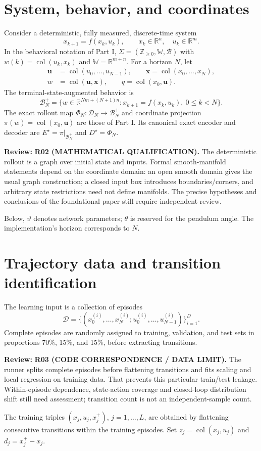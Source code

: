 \documentclass[11pt]{article}
\newcommand{\col}{\operatorname{col}}
\newcommand{\review}[1]{\par\noindent\textcolor{red!70!black}{\textbf{Review:} #1}\par}
\begin{document}
\section{System, behavior, and coordinates}
Consider a deterministic, fully measured, discrete-time system
\begin{equation}\label{eq:system}
x_{k+1}=f(x_k,u_k),\qquad x_k\in\mathbb R^n,\quad u_k\in\mathbb R^m.
\end{equation}
In the behavioral notation of Part I, $\Sigma=(\mathbb Z_{\geq0},\mathbb W,\mathcal B)$ with $w(k)=\col(u_k,x_k)$ and $\mathbb W=\mathbb R^{m+n}$. For a horizon $N$, let
\begin{align}
\mathbf u&=\col(u_0,\ldots,u_{N-1}),\qquad \mathbf x=\col(x_0,\ldots,x_N),\label{eq:sequences}\\
w&=\col(\mathbf u,\mathbf x),\qquad q=\col(x_0,\mathbf u).\label{eq:coordinates}
\end{align}
The terminal-state-augmented behavior is
\begin{equation}\label{eq:behavior}
\mathcal B_N^+=\{w\in\mathbb R^{Nm+(N+1)n}:x_{k+1}=f(x_k,u_k),\ 0\leq k<N\}.
\end{equation}
The exact rollout map $\Phi_N:\mathcal D_N\to\mathcal B_N^+$ and coordinate projection $\pi(w)=\col(x_0,\mathbf u)$ are those of Part I. Its canonical exact encoder and decoder are $E^\star=\pi|_{\mathcal B_N^+}$ and $D^\star=\Phi_N$.
\review{\textbf{R02 (MATHEMATICAL QUALIFICATION).} The deterministic rollout is a graph over initial state and inputs. Formal smooth-manifold statements depend on the coordinate domain: an open smooth domain gives the usual graph construction; a closed input box introduces boundaries/corners, and arbitrary state restrictions need not define manifolds. The precise hypotheses and conclusions of the foundational paper still require independent review.}
 Below, $\vartheta$ denotes network parameters; $\theta$ is reserved for the pendulum angle. The implementation's horizon corresponds to $N$.

\section{Trajectory data and transition identification}
The learning input is a collection of episodes
\begin{equation}\label{eq:episodes}
\mathcal D=\{(x_0^{(i)},\ldots,x_N^{(i)};u_0^{(i)},\ldots,u_{N-1}^{(i)})\}_{i=1}^D.
\end{equation}
Complete episodes are randomly assigned to training, validation, and test sets in proportions 70\%, 15\%, and 15\%, before extracting transitions.
\review{\textbf{R03 (CODE CORRESPONDENCE / DATA LIMIT).} The runner splits complete episodes before flattening transitions and fits scaling and local regression on training data. That prevents this particular train/test leakage. Within-episode dependence, state-action coverage and closed-loop distribution shift still need assessment; transition count is not an independent-sample count.}
 The training triples $(x_j,u_j,x_j^+)$, $j=1,\ldots,L$, are obtained by flattening consecutive transitions within the training episodes. Set $z_j=\col(x_j,u_j)$ and $d_j=x_j^+-x_j$.
\end{document}
